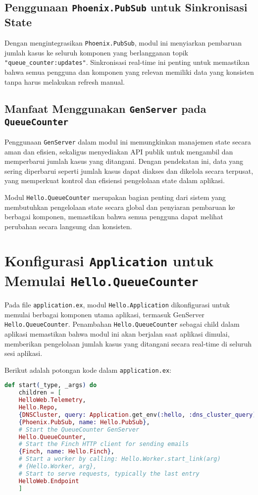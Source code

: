 \subsection{Penggunaan \texttt{Phoenix.PubSub} untuk Sinkronisasi State}
Dengan mengintegrasikan \texttt{Phoenix.PubSub}, modul ini menyiarkan pembaruan jumlah kasus ke seluruh komponen yang berlangganan topik \texttt{"queue\_counter:updates"}. Sinkronisasi real-time ini penting untuk memastikan bahwa semua pengguna dan komponen yang relevan memiliki data yang konsisten tanpa harus melakukan refresh manual.

\subsection{Manfaat Menggunakan \texttt{GenServer} pada \texttt{QueueCounter}}
Penggunaan \texttt{GenServer} dalam modul ini memungkinkan manajemen state secara aman dan efisien, sekaligus menyediakan API publik untuk mengambil dan memperbarui jumlah kasus yang ditangani. Dengan pendekatan ini, data yang sering diperbarui seperti jumlah kasus dapat diakses dan dikelola secara terpusat, yang memperkuat kontrol dan efisiensi pengelolaan state dalam aplikasi.

Modul \texttt{Hello.QueueCounter} merupakan bagian penting dari sistem yang membutuhkan pengelolaan state secara global dan penyiaran pembaruan ke berbagai komponen, memastikan bahwa semua pengguna dapat melihat perubahan secara langsung dan konsisten.

\section{Konfigurasi \texttt{Application} untuk Memulai \texttt{Hello.QueueCounter}}

Pada file \texttt{application.ex}, modul \texttt{Hello.Application} dikonfigurasi untuk memulai berbagai komponen utama aplikasi, termasuk GenServer \texttt{Hello.QueueCounter}. Penambahan \texttt{Hello.QueueCounter} sebagai child dalam aplikasi memastikan bahwa modul ini akan berjalan saat aplikasi dimulai, memberikan pengelolaan jumlah kasus yang ditangani secara real-time di seluruh sesi aplikasi.

Berikut adalah potongan kode dalam \texttt{application.ex}:

\begin{lstlisting}[language=Elixir]
	def start(_type, _args) do
	children = [
	HelloWeb.Telemetry,
	Hello.Repo,
	{DNSCluster, query: Application.get_env(:hello, :dns_cluster_query) || :ignore},
	{Phoenix.PubSub, name: Hello.PubSub},
	# Start the QueueCounter GenServer
	Hello.QueueCounter,
	# Start the Finch HTTP client for sending emails
	{Finch, name: Hello.Finch},
	# Start a worker by calling: Hello.Worker.start_link(arg)
	# {Hello.Worker, arg},
	# Start to serve requests, typically the last entry
	HelloWeb.Endpoint
	]
\end{lstlisting}

